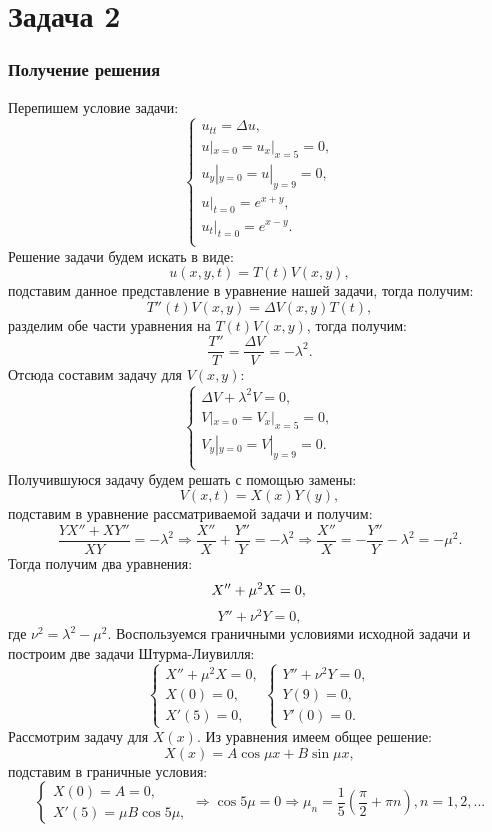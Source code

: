 \documentclass[11pt]{article}
\begin{document}
\newpage
\section*{Задача 2}
\subsubsection*{Получение решения}
Перепишем условие задачи:
$$\begin{cases}
    u_{tt}=\Delta u,\\
    u|_{x=0}=u_x|_{x=5}=0,\\
    u_y|_{y=0}=u|_{y=9}=0,\\
    u|_{t=0} = e^{x+y},\\
    u_t|_{t=0}=e^{x-y}.\\
\end{cases}$$
Решение задачи будем искать в виде:
$$u(x,y,t)=T(t)V(x,y),$$
подставим данное представление в уравнение нашей задачи, тогда получим:
$$T''(t)V(x,y)=\Delta V(x,y) T(t),$$
разделим обе части уравнения на $T(t)V(x,y)$, тогда получим:
$$\frac{T''}{T}=\frac{\Delta V}{V}=-\lambda^2.$$
Отсюда составим задачу для $V(x,y)$:
$$\begin{cases}
    \Delta V+\lambda^2 V=0, \\
    V|_{x=0}=V_x|_{x=5}=0,\\
    V_y|_{y=0}=V|_{y=9}=0.\\
\end{cases}$$
Получившуюся задачу будем решать с помощью замены: $$V(x,t)=X(x)Y(y),$$
подставим в уравнение рассматриваемой задачи и получим: $$\frac{YX''+XY''}{XY}=-\lambda^2 \Rightarrow \frac{X''}{X}+\frac{Y''}{Y}=-\lambda^2 \Rightarrow \frac{X''}{X}=-\frac{Y''}{Y}-\lambda^2=-\mu^2.$$
Тогда получим два уравнения:
$$X''+\mu^2X=0,\\$$ $$Y''+\nu^2Y=0,$$
где $\nu^2=\lambda^2-\mu^2.$ Воспользуемся граничными условиями исходной задачи и построим две задачи Штурма-Лиувилля:
$$\begin{cases}
    X''+\mu^2X=0,\\
    X(0)=0,\\
    X'(5)=0,
\end{cases}
\begin{cases}
    Y''+\nu^2Y=0,\\
    Y(9)=0,\\
    Y'(0)=0.
\end{cases}$$
Рассмотрим задачу для $X(x)$. Из уравнения имеем общее решение:
$$X(x)=A\cos{\mu x}+B\sin{\mu x},$$
подставим в граничные условия:
$$\begin{cases}
    X(0)=A=0,\\
    X'(5)=\mu B\cos{5\mu},
\end{cases}\Rightarrow 
\cos{5\mu}=0 \Rightarrow \mu_n=\dfrac15 (\frac{\pi}{2}+\pi n), n=1, 2, ...$$
\end{document}
